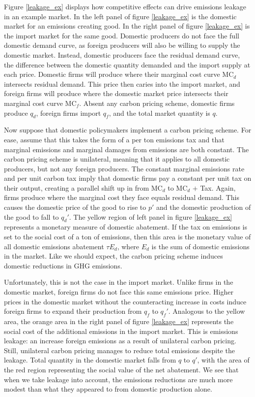 Figure \ref{leakage_ex} displays how competitive effects can drive emissions leakage in an example market. In the left panel of figure \ref{leakage_ex} is the domestic market for an emissions creating good. In the right panel of figure \ref{leakage_ex} is the import market for the same good. Domestic producers do not face the full domestic demand curve, as foreign producers will also be willing to supply the domestic market. Instead, domestic producers face the residual demand curve, the difference between the domestic quantity demanded and the import supply at each price. Domestic firms will produce where their marginal cost curve MC$_d$ intersects residual demand. This price then caries into the import market, and foreign firms will produce where the domestic market price intersects their marginal cost curve MC$_f$. Absent any carbon pricing scheme, domestic firms produce $q_d$, foreign firms import $q_f$, and the total market quantity is $q$. 

Now suppose that domestic policymakers implement a carbon pricing scheme. For ease, assume that this takes the form of a per ton emissions tax and that marginal emissions and marginal damages from emissions are both constant. The carbon pricing scheme is unilateral, meaning that it applies to all domestic producers, but not any foreign producers. The constant marginal emissions rate and per unit carbon tax imply that domestic firms pay a constant per unit tax on their output, creating a parallel shift up in from MC$_d$ to MC$_d$ $+$ Tax. Again, firms produce where the marginal cost they face equals residual demand. This causes the domestic price of the good to rise to $p'$ and the domestic production of the good to fall to $q_d'$. The yellow region of left panel in figure \ref{leakage_ex} represents a monetary measure of domestic abatement. If the tax on emissions is set to the social cost of a ton of emissions, then this area is the monetary value of all domestic emissions abatement $\tau E_d$, where $E_d$ is the sum of domestic emissions in the market. Like we should expect, the carbon pricing scheme induces domestic reductions in GHG emissions.

Unfortunately, this is not the case in the import market. Unlike firms in the domestic market, foreign firms do not face this same emissions price. Higher prices in the domestic market without the counteracting increase in costs induce foreign firms to expand their production from $q_f$ to $q_f'$. Analogous to the yellow area, the orange area in the right panel of figure \ref{leakage_ex} represents the social cost of the additional emissions in the import market. This is emissions leakage: an increase foreign emissions as a result of unilateral carbon pricing. Still, unilateral carbon pricing manages to reduce total emissions despite the leakage. Total quantity in the domestic market falls from $q$ to $q'$, with the area of the red region representing the social value of the net abatement. We see that when we take leakage into account, the emissions reductions are much more modest than what they appeared to from domestic production alone. 

